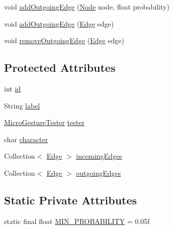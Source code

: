 \begin{DoxyCompactItemize}
\item 
void \hyperlink{classch_1_1zhaw_1_1ba10__bsha__1_1_1graph_1_1Node_aeb5d29fd379ad2b13cadbac51f880390}{addOutgoingEdge} (\hyperlink{classch_1_1zhaw_1_1ba10__bsha__1_1_1graph_1_1Node}{Node} node, float probability)
\item 
void \hyperlink{classch_1_1zhaw_1_1ba10__bsha__1_1_1graph_1_1Node_aeb360f45f8582ea6cda8ef9b6f074df0}{addOutgoingEdge} (\hyperlink{classch_1_1zhaw_1_1ba10__bsha__1_1_1graph_1_1Edge}{Edge} edge)
\item 
void \hyperlink{classch_1_1zhaw_1_1ba10__bsha__1_1_1graph_1_1Node_ad31d9211d2a1fa2984f02f2faa37c6f1}{removeOutgoingEdge} (\hyperlink{classch_1_1zhaw_1_1ba10__bsha__1_1_1graph_1_1Edge}{Edge} edge)
\end{DoxyCompactItemize}
\subsection*{Protected Attributes}
\begin{DoxyCompactItemize}
\item 
int \hyperlink{classch_1_1zhaw_1_1ba10__bsha__1_1_1graph_1_1Node_a6ac4c87055132ff5de2f303d64baf0ba}{id}
\item 
String \hyperlink{classch_1_1zhaw_1_1ba10__bsha__1_1_1graph_1_1Node_a02527090afc270a47397d31fedb70375}{label}
\item 
\hyperlink{classch_1_1zhaw_1_1ba10__bsha__1_1_1service_1_1MicroGestureTester}{MicroGestureTester} \hyperlink{classch_1_1zhaw_1_1ba10__bsha__1_1_1graph_1_1Node_abec03ba4df889f23c0d30d70edee59f6}{tester}
\item 
char \hyperlink{classch_1_1zhaw_1_1ba10__bsha__1_1_1graph_1_1Node_ab6bd424b381dc0f19d9f49d0b2cb56fc}{character}
\item 
Collection$<$ \hyperlink{classch_1_1zhaw_1_1ba10__bsha__1_1_1graph_1_1Edge}{Edge} $>$ \hyperlink{classch_1_1zhaw_1_1ba10__bsha__1_1_1graph_1_1Node_a588bea1c6cceb5f66e5e25115b9b12be}{incomingEdges}
\item 
Collection$<$ \hyperlink{classch_1_1zhaw_1_1ba10__bsha__1_1_1graph_1_1Edge}{Edge} $>$ \hyperlink{classch_1_1zhaw_1_1ba10__bsha__1_1_1graph_1_1Node_a130b2d1b8b68b2fe91d3753b23c766e2}{outgoingEdges}
\end{DoxyCompactItemize}
\subsection*{Static Private Attributes}
\begin{DoxyCompactItemize}
\item 
static final float \hyperlink{classch_1_1zhaw_1_1ba10__bsha__1_1_1graph_1_1Node_abb4e5408b8e351e07fab48d8f45ee50d}{MIN\_\-PROBABILITY} = 0.05f
\end{DoxyCompactItemize}


